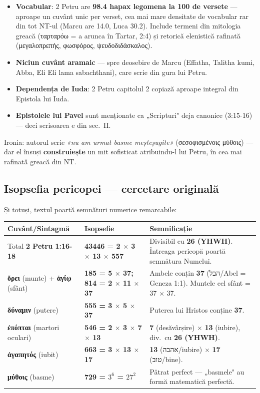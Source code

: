 \documentclass[12pt,a4paper,twoside,openany]{book}
\begin{document}
\begin{itemize}
\item \textbf{Vocabular}: 2 Petru are \textbf{98.4 hapax legomena la 100 de versete} --- aproape un cuvânt unic per verset, cea mai mare densitate de vocabular rar din tot NT-ul (Marcu are 14.0, Luca 30.2). Include termeni din mitologia greacă (ταρταρόω = a arunca în Tartar, 2:4) și retorică elenistică rafinată (μεγαλοπρεπής, φωσφόρος, ψευδοδιδάσκαλος).
\item \textbf{Niciun cuvânt aramaic} --- spre deosebire de Marcu (Effatha, Talitha kumi, Abba, Eli Eli lama sabachthani), care scrie din gura lui Petru.
\item \textbf{Dependența de Iuda}: 2 Petru capitolul 2 copiază aproape integral din Epistola lui Iuda.
\item \textbf{Epistolele lui Pavel} sunt menționate ca „Scripturi" deja canonice (3:15-16) --- deci scrisoarea e din sec.\ II.
\end{itemize}

Ironia: autorul scrie \textit{«nu am urmat basme meșteșugite»} (σεσοφισμένοις μύθοις) --- dar el însuși \textbf{construiește} un mit sofisticat atribuindu-l lui Petru, în cea mai rafinată greacă din NT.

\subsection*{Isopsefia pericopei --- cercetare originală}

Și totuși, textul poartă semnături numerice remarcabile:

\begin{center}
\small
\begin{tabular}{L{4cm}C{3cm}L{6cm}}
\toprule
{}
\textbf{Cuvânt/Sintagmă} & \textbf{Isopsefie} & \textbf{Semnificație} \\
\midrule
Total \textbf{2 Petru 1:16-18} & \textbf{\textcolor{primary}{43446 = 2 $\times$ 3 $\times$ 13 $\times$ 557}} & Divisibil cu \textbf{26 (YHWH)}. Întreaga pericopă poartă semnătura Numelui. \\
\textbf{ὄρει} (munte) + \textbf{ἁγίῳ} (sfânt) & \textbf{\textcolor{primary}{185 = 5 $\times$ 37; 814 = 2 $\times$ 11 $\times$ 37}} & Ambele conțin \textbf{37} (הבל/Abel = Geneza 1:1). Muntele cel sfânt = 37 $\times$ 37. \\
\textbf{δύναμιν} (putere) & \textbf{\textcolor{primary}{555 = 3 $\times$ 5 $\times$ 37}} & Puterea lui Hristos conține \textbf{37}. \\
\textbf{ἐπόπται} (martori oculari) & \textbf{\textcolor{primary}{546 = 2 $\times$ 3 $\times$ 7 $\times$ 13}} & \textbf{7} (desăvârșire) $\times$ \textbf{13} (iubire), div.\ cu \textbf{26 (YHWH)}. \\
\textbf{ἀγαπητός} (iubit) & \textbf{\textcolor{primary}{663 = 3 $\times$ 13 $\times$ 17}} & \textbf{13} (אהבה/iubire) $\times$ \textbf{17} (טוב/bine). \\
\textbf{μύθοις} (basme) & \textbf{\textcolor{primary}{729 = $3^6$ = $27^2$}} & Pătrat perfect --- „basmele" au formă matematică perfectă. \\
\bottomrule
\end{tabular}
\end{center}
\normalsize
\end{document}
